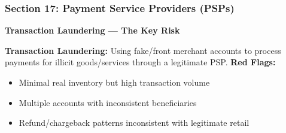 \documentclass[12pt,aspectratio=169]{beamer}
\begin{document}
	\begin{frame}
		\frametitle{\fontsize{13}{15}\selectfont \textbf{Section 17: Payment Service Providers (PSPs)}}
		\vspace{0.3cm}
		\begin{center}
			{\fontsize{12}{14}\selectfont \textbf{Transaction Laundering — The Key Risk}}
		\end{center}
		\vspace{0.2cm}
		\begin{block}{}
			\centering
			\textbf{Transaction Laundering:} Using fake/front merchant accounts to process payments for illicit goods/services through a legitimate PSP.
			\vspace{0.1cm}
			\textbf{Red Flags:}
			\begin{itemize}
				\item Minimal real inventory but high transaction volume
				\item Multiple accounts with inconsistent beneficiaries
				\item Refund/chargeback patterns inconsistent with legitimate retail
			\end{itemize}
		\end{block}
	\end{frame}
	
\end{document}
